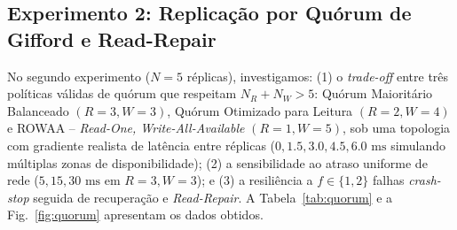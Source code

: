 \documentclass[conference,10pt]{IEEEtran}
\begin{document}
\subsection{Experimento 2: Replicação por Quórum de Gifford e Read-Repair}

No segundo experimento ($N=5$ réplicas), investigamos: (1) o \textit{trade-off} entre três políticas válidas de quórum que respeitam $N_R + N_W > 5$: Quórum Maioritário Balanceado $(R=3, W=3)$, Quórum Otimizado para Leitura $(R=2, W=4)$ e ROWAA -- \textit{Read-One, Write-All-Available} $(R=1, W=5)$, sob uma topologia com gradiente realista de latência entre réplicas ($0, 1.5, 3.0, 4.5, 6.0\text{ ms}$ simulando múltiplas zonas de disponibilidade); (2) a sensibilidade ao atraso uniforme de rede ($5, 15, 30\text{ ms}$ em $R=3, W=3$); e (3) a resiliência a $f \in \{1, 2\}$ falhas \textit{crash-stop} seguida de recuperação e \textit{Read-Repair}. A Tabela~\ref{tab:quorum} e a Fig.~\ref{fig:quorum} apresentam os dados obtidos.

\begin{table}[t]
\centering
\caption{Latência de Escrita/Leitura e Reparo por Quórum ($N=5$, $R=5$ réplicas, 100\% de leituras consistentes)}
\label{tab:quorum}
\end{table}
\end{document}

